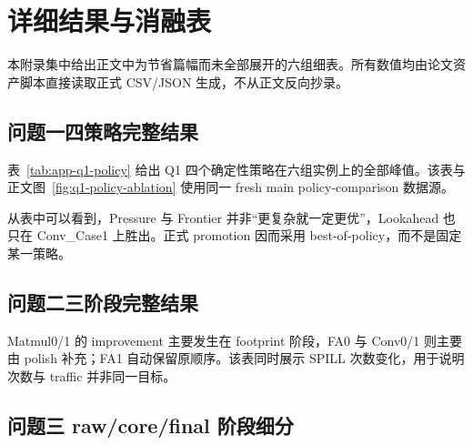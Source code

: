 \section{详细结果与消融表}

本附录集中给出正文中为节省篇幅而未全部展开的六组细表。所有数值均由论文资产脚本直接读取正式 CSV/JSON 生成，不从正文反向抄录。

\subsection{问题一四策略完整结果}

表~\ref{tab:app-q1-policy} 给出 Q1 四个确定性策略在六组实例上的全部峰值。该表与正文图~\ref{fig:q1-policy-ablation} 使用同一 fresh main policy-comparison 数据源。

\begin{table}[H]
    \centering
    \caption{问题一四策略完整消融结果}
    \label{tab:app-q1-policy}
    \resizebox{\textwidth}{!}{}
\end{table}

从表中可以看到，Pressure 与 Frontier 并非“更复杂就一定更优”，Lookahead 也只在 Conv\_Case1 上胜出。正式 promotion 因而采用 best-of-policy，而不是固定某一策略。

\subsection{问题二三阶段完整结果}

\begin{table}[H]
    \centering
    \caption{问题二 raw baseline、footprint-only 与 promoted 的详细对比}
    \label{tab:app-q2-stage}
    \resizebox{\textwidth}{!}{}
\end{table}

Matmul0/1 的 improvement 主要发生在 footprint 阶段，FA0 与 Conv0/1 则主要由 polish 补充；FA1 自动保留原顺序。该表同时展示 SPILL 次数变化，用于说明次数与 traffic 并非同一目标。

\subsection{问题三 raw/core/final 阶段细分}

\begin{table}[H]
    \centering
    \caption{问题三 fixed-traffic 优化阶段的绝对周期贡献}
    \label{tab:app-q3-stage}
    \resizebox{\textwidth}{!}{}
\end{table}

